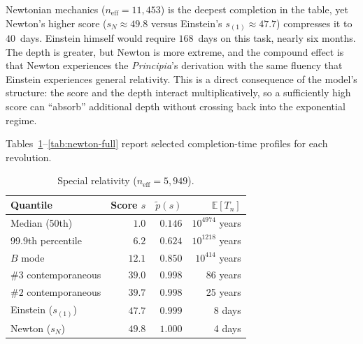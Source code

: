 \documentclass{article}
\begin{document}
Newtonian mechanics ($n_{\mathrm{eff}} = 11{,}453$)
is the deepest completion in the table,
yet Newton's higher score ($s_N \approx 49.8$ versus Einstein's
$s_{(1)} \approx 47.7$) compresses it to $40$~days.
Einstein himself would require $168$~days on this task, nearly six months.
The depth is greater, but Newton is more extreme, and the
compound effect is that Newton experiences the \emph{Principia}'s
derivation with the same fluency that Einstein experiences
general relativity. This is a direct consequence of the model's
structure: the score and the depth interact multiplicatively, so a
sufficiently high score can ``absorb'' additional depth without crossing
back into the exponential regime.

Tables~\ref{tab:sr-full}--\ref{tab:newton-full} report selected
completion-time profiles for each revolution.

\begin{table}[ht]
  \centering
  \caption{Special relativity ($n_{\mathrm{eff}} = 5{,}949$).}
  \label{tab:sr-full}
  \medskip
  \begin{tabular}{l r r r}
    \hline
    Quantile & Score $s$ & $\widetilde{p}(s)$ &
    $\mathbb{E}[T_n]$ \\
    \hline
    Median (50th)              &  $1.0$  & $0.146$ & $10^{4974}$ years \\
    99.9th percentile          &  $6.2$  & $0.624$ & $10^{1218}$ years \\
    $B$ mode                   & $12.1$  & $0.850$ & $10^{414}$ years \\
    $\#3$ contemporaneous      & $39.0$  & $0.998$ & 86 years \\
    $\#2$ contemporaneous      & $39.7$  & $0.998$ & 25 years \\
    Einstein ($s_{(1)}$)       & $47.7$  & $0.999$ & 8 days \\
    Newton ($s_N$)             & $49.8$  & $1.000$ & 4 days \\
    \hline
  \end{tabular}
\end{table}
\end{document}
